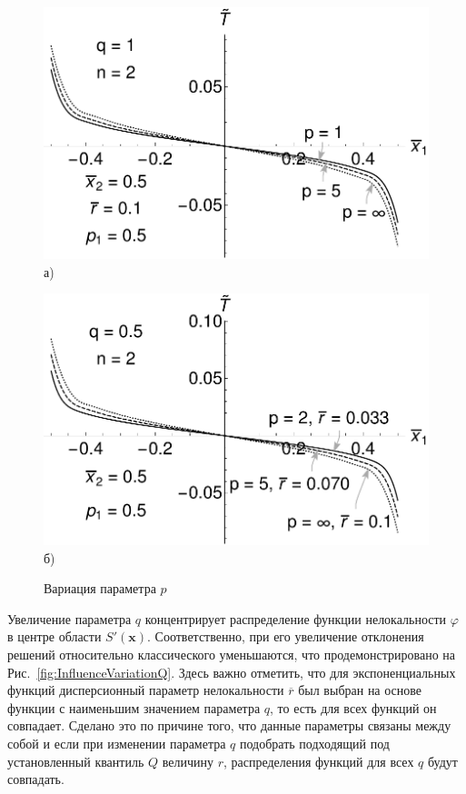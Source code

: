 \begin{figure}[ht]
    \begin{minipage}[b][][b]{0.49\linewidth}\centering
        \includegraphics[width=\linewidth]{pics/TPolyInfluenceVariationP.pdf} \\ а)
    \end{minipage}
    \hfill
    \begin{minipage}[b][][b]{0.49\linewidth}\centering
        \includegraphics[width=\linewidth]{pics/TExpInfluenceVariationP.pdf} \\ б)
    \end{minipage}
    \caption{Вариация параметра $p$}
    \label{fig:InfluenceVariationP}
\end{figure}

Увеличение параметра $q$ концентрирует распределение функции нелокальности $\varphi$ в центре области $S'(\boldsymbol{x})$. Соответственно, при его увеличение отклонения решений относительно классического уменьшаются, что продемонстрировано на Рис.~\ref{fig:InfluenceVariationQ}. Здесь важно отметить, что для экспоненциальных функций дисперсионный параметр нелокальности $\overline{r}$ был выбран на основе функции с наименьшим значением параметра $q$, то есть для всех функций он совпадает. Сделано это по причине того, что данные параметры связаны между собой и если при изменении параметра $q$ подобрать подходящий под установленный квантиль $Q$ величину $r$, распределения функций для всех $q$ будут совпадать.

